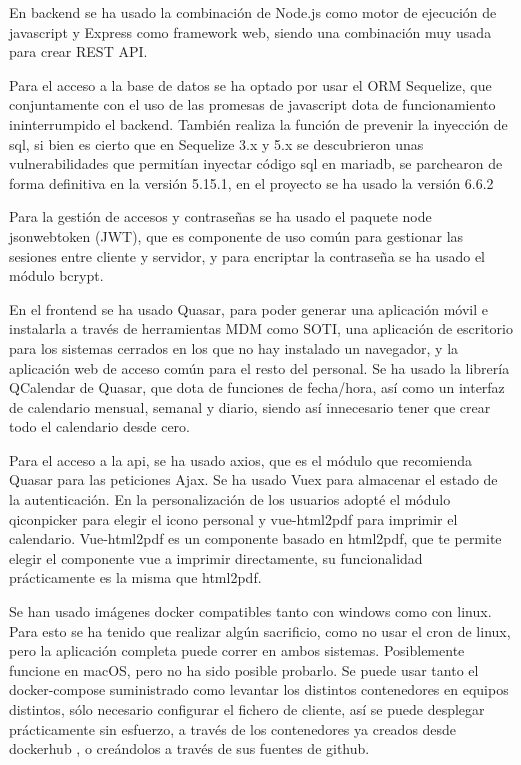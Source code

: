 \documentclass[11pt,spanish,listoffigures,listoftables]{tfgetsinf}
\begin{document}
En backend se ha usado la combinación de Node.js como motor de ejecución de javascript y Express como framework web, siendo una combinación muy usada para crear REST API.

Para el acceso a la base de datos se ha optado por usar el ORM Sequelize, que conjuntamente con el uso de las promesas de javascript dota de funcionamiento ininterrumpido el backend. 
También realiza la función de prevenir la inyección de sql, si bien es cierto que en Sequelize 3.x y 5.x se descubrieron unas vulnerabilidades que permitían inyectar código sql en mariadb, se parchearon de forma definitiva en la versión 5.15.1, en el proyecto se ha usado la versión 6.6.2

Para la gestión de accesos y contraseñas se ha usado el paquete node jsonwebtoken (JWT), que es componente de uso común para gestionar las sesiones entre cliente y servidor, y para encriptar la contraseña se ha usado el módulo bcrypt.

En el frontend se ha usado Quasar, para poder generar una aplicación móvil e instalarla a través de herramientas MDM como SOTI, una aplicación de escritorio para los sistemas cerrados en los que no hay instalado un navegador, y la aplicación web de acceso común para el resto del personal.
Se ha usado la librería QCalendar de Quasar, que dota de funciones de fecha/hora, así como un interfaz de calendario mensual, semanal y diario, siendo así innecesario tener que crear todo el calendario desde cero.

Para el acceso a la api, se ha usado axios, que es el módulo que recomienda Quasar para las peticiones Ajax. Se ha usado Vuex para almacenar el estado de la autenticación.
En la personalización de los usuarios adopté el módulo qiconpicker para elegir el icono personal y vue-html2pdf para imprimir el calendario. Vue-html2pdf es un componente basado en html2pdf, que te permite elegir el componente vue a imprimir directamente, su funcionalidad prácticamente es la misma que html2pdf.

Se han usado imágenes docker compatibles tanto con windows como con linux. Para esto se ha tenido que realizar algún sacrificio, como no usar el cron de linux, pero la aplicación completa puede correr en ambos sistemas. Posiblemente funcione en macOS, pero no ha sido posible probarlo.
Se puede usar tanto el docker-compose suministrado como levantar los distintos contenedores en equipos distintos, sólo necesario configurar el fichero de cliente, así se puede desplegar prácticamente sin esfuerzo, a través de los contenedores ya creados desde dockerhub , o creándolos a través de sus fuentes de github. 
\end{document}
